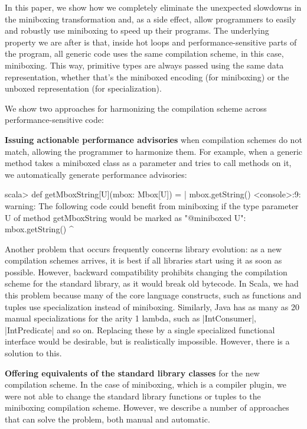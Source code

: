 In this paper, we show how we completely eliminate the unexpected slowdowns in the miniboxing transformation and, as a side effect, allow programmers to easily and robustly use miniboxing to speed up their programs. The underlying property we are after is that, inside hot loops and performance-sensitive parts of the program, all generic code uses the same compilation scheme, in this case, miniboxing. This way, primitive types are always passed using the same data representation, whether that's the miniboxed encoding (for miniboxing) or the unboxed representation (for specialization).

We show two approaches for harmonizing the compilation scheme across performance-sensitive code:

\textbf{Issuing actionable performance advisories} when compilation schemes do not match, allowing the programmer to harmonize them. For example, when a generic method takes a miniboxed class as a parameter and tries to call methods on it, we automatically generate performance advisories:

\begin{lstlisting-nobreak}
scala> def getMboxString[U](mbox: Mbox[U]) =
     |   mbox.getString()
<console>:9: warning: The following code could benefit
from miniboxing if the type parameter U of method
getMboxString would be marked as "@miniboxed U":
         mbox.getString()
             ^
\end{lstlisting-nobreak}

Another problem that occurs frequently concerns library evolution: as a new compilation schemes arrives, it is best if all libraries start using it as soon as possible. However, backward compatibility prohibits changing the compilation scheme for the standard library, as it would break old bytecode. In Scala, we had this problem because many of the core language constructs, such as functions and tuples use specialization instead of miniboxing. Similarly, Java has as many as 20 manual specializations for the arity 1 lambda, such as |IntConsumer|, |IntPredicate| and so on. Replacing these by a single specialized functional interface would be desirable, but is realistically impossible. However, there is a solution to this.

\textbf{Offering equivalents of the standard library classes} for the new compilation scheme. In the case of miniboxing, which is a compiler plugin, we were not able to change the standard library functions or tuples to the miniboxing compilation scheme. However, we describe a number of approaches that can solve the problem, both manual and automatic.

